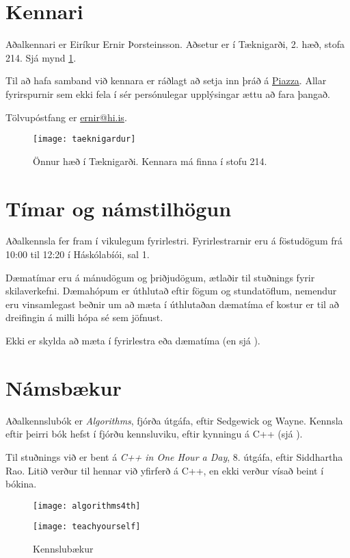 \documentclass{article}
\begin{document}
\section{Kennari}
Aðalkennari er Eiríkur Ernir Þorsteinsson. Aðsetur er í Tæknigarði, 2. hæð, stofa 214. Sjá mynd \ref{fig:taeknigardur}.

Til að hafa samband við kennara er ráðlagt að setja inn þráð á \href{https://piazza.com/hi.is/spring2017/tl203g/}{Piazza}. Allar fyrirspurnir sem ekki fela í sér persónulegar upplýsingar ættu að fara þangað. 

Tölvupóstfang er \href{mailto:ernir@hi.is}{ernir@hi.is}.

\begin{figure}
\caption{Önnur hæð í Tæknigarði. Kennara má finna í stofu 214.}
\label{fig:taeknigardur}
\begin{center}
\texttt{[image: taeknigardur]}
\end{center}
\end{figure}

\section{Tímar og námstilhögun}
Aðalkennsla fer fram í vikulegum fyrirlestri. Fyrirlestrarnir eru á föstudögum frá 10:00 til 12:20 í Háskólabíói, sal 1.

Dæmatímar eru á mánudögum og þriðjudögum, ætlaðir til stuðnings fyrir skilaverkefni. Dæmahópum er úthlutað eftir fögum og stundatöflum, nemendur eru vinsamlegast beðnir um að mæta í úthlutaðan dæmatíma ef kostur er til að dreifingin á milli hópa sé sem jöfnust.

Ekki er skylda að mæta í fyrirlestra eða dæmatíma (en sjá ).
\section{Námsbækur}
Aðalkennslubók er \emph{Algorithms}, fjórða útgáfa, eftir Sedgewick og Wayne. Kennsla eftir þeirri bók hefst í fjórðu kennsluviku, eftir kynningu á C++ (sjá ). 

Til stuðnings við er bent á \emph{C++ in One Hour a Day}, 8. útgáfa, eftir Siddhartha Rao. Litið verður til hennar við yfirferð á C++, en ekki verður vísað beint í bókina.

\begin{figure}
\caption{Kennslubækur}
\begin{multicols}{2}
\begin{center}
\texttt{[image: algorithms4th]}
\end{center}

\begin{center}
\texttt{[image: teachyourself]}
\end{center}
\end{multicols}
\end{figure}
\end{document}
